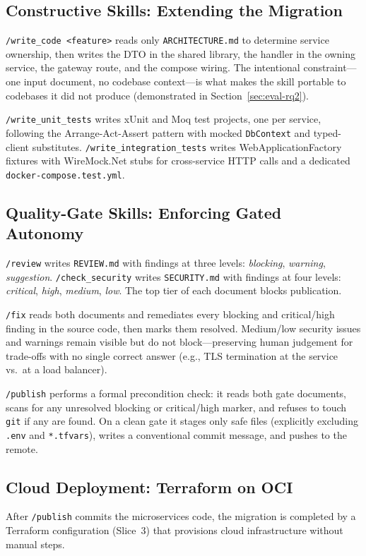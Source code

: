\documentclass[10pt,journal,compsoc]{IEEEtran}
\begin{document}
\subsection{Constructive Skills: Extending the Migration}
\texttt{/write\_code <feature>} reads only \texttt{ARCHITECTURE.md}
to determine service ownership, then writes the DTO in the shared
library, the handler in the owning service, the gateway route, and
the compose wiring.  The intentional constraint—one input document,
no codebase context—is what makes the skill portable to codebases it
did not produce (demonstrated in Section~\ref{sec:eval-rq2}).

\texttt{/write\_unit\_tests} writes xUnit and Moq test projects, one
per service, following the Arrange-Act-Assert pattern with mocked
\texttt{DbContext} and typed-client substitutes.
\texttt{/write\_integration\_tests} writes WebApplicationFactory
fixtures with WireMock.Net stubs for cross-service HTTP calls and a
dedicated \texttt{docker-compose.test.yml}.

\subsection{Quality-Gate Skills: Enforcing Gated Autonomy}
\texttt{/review} writes \texttt{REVIEW.md} with findings at three
levels: \emph{blocking}, \emph{warning}, \emph{suggestion}.
\texttt{/check\_security} writes \texttt{SECURITY.md} with findings
at four levels: \emph{critical}, \emph{high}, \emph{medium},
\emph{low}.  The top tier of each document blocks publication.

\texttt{/fix} reads both documents and remediates every blocking and
critical/high finding in the source code, then marks them resolved.
Medium/low security issues and warnings remain visible but do not
block—preserving human judgement for trade-offs with no single correct
answer (e.g., TLS termination at the service vs.\ at a load balancer).

\texttt{/publish} performs a formal precondition check: it reads both
gate documents, scans for any unresolved blocking or critical/high
marker, and refuses to touch \texttt{git} if any are found.  On a
clean gate it stages only safe files (explicitly excluding
\texttt{.env} and \texttt{*.tfvars}), writes a conventional commit
message, and pushes to the remote.

\subsection{Cloud Deployment: Terraform on OCI}
After \texttt{/publish} commits the microservices code, the migration
is completed by a Terraform configuration (Slice~3) that provisions
cloud infrastructure without manual steps.
\end{document}
